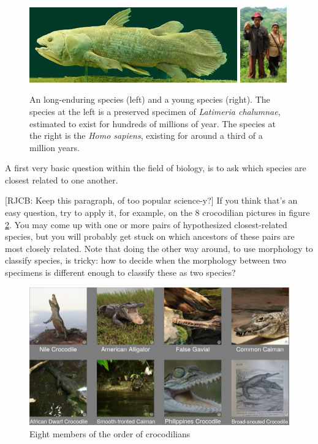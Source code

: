 \begin{figure}[H]
  \includegraphics[width=0.80\textwidth]{latimeria_chalumnae.jpg}
  \includegraphics[width=0.18\textwidth]{homo_sapiens.jpg}
  \caption{
    An long-enduring species (left) and a young species (right).
    The species at the left is a preserved specimen of \textit{Latimeria chalumnae}, 
    estimated to exist for hundreds of millions of year.
    The species at the right is the \textit{Homo sapiens}, 
    existing for around a third of a million years.
  }
  \label{fig:long_enduring_and_young_species}
\end{figure}

A first very basic question within the field of biology,
is to ask which species are closest related to
one another. 

[RJCB: Keep this paragraph, of too popular science-y?]
If you think that's an easy question, try to apply it, 
for example, on the 8 crocodilian pictures in figure \ref{fig:crocodialians}.
You may come up with one or more pairs of hypothesized closest-related species,
but you will probably get stuck on which ancestors of these pairs
are most closely related. Note that doing the other way around, to use
morphology to classify species, is tricky: how to decide when the morphology 
between two specimens is different enough to classify these as two species?

\begin{figure}[H]
  \includegraphics[width=1.0\textwidth]{crocodilians.png}
  \caption{
    Eight members of the order of crocodilians
  }
  \label{fig:crocodialians}
\end{figure}

